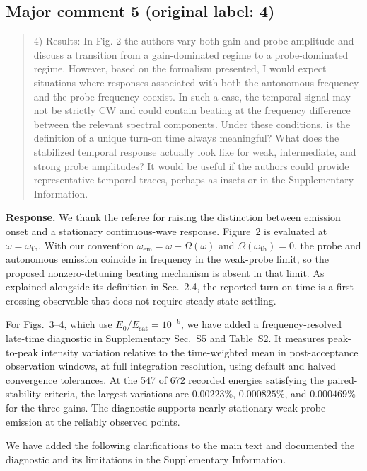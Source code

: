 \documentclass[11pt,a4paper]{article}
\newcommand{\reviewercomment}[1]{\begin{quote}\small #1\end{quote}}
\newcommand{\response}[1]{\par\textbf{Response.} #1\par}
\begin{document}
\subsection*{Major comment 5 (original label: 4)}
\label{r1-major-5}
\reviewercomment{
4) Results: In Fig. 2 the authors vary both gain and probe amplitude and discuss a transition from a gain-dominated regime to a probe-dominated regime. However, based on the formalism presented, I would expect situations where responses associated with both the autonomous frequency and the probe frequency coexist. In such a case, the temporal signal may not be strictly CW and could contain beating at the frequency difference between the relevant spectral components. Under these conditions, is the definition of a unique turn-on time always meaningful? What does the stabilized temporal response actually look like for weak, intermediate, and strong probe amplitudes? It would be useful if the authors could provide representative temporal traces, perhaps as insets or in the Supplementary Information.
}
\response{We thank the referee for raising the distinction between emission onset and a stationary continuous-wave response. Figure~2 is evaluated at $\omega=\omega_{\mathrm{th}}$. With our convention $\omega_{\mathrm{em}}=\omega-\Omega(\omega)$ and $\Omega(\omega_{\mathrm{th}})=0$, the probe and autonomous emission coincide in frequency in the weak-probe limit, so the proposed nonzero-detuning beating mechanism is absent in that limit. As explained alongside its definition in Sec.~2.4, the reported turn-on time is a first-crossing observable that does not require steady-state settling.

For Figs.~3--4, which use $E_0/E_{\mathrm{sat}}=10^{-9}$, we have added a frequency-resolved late-time diagnostic in Supplementary Sec.~S5 and Table~S2. It measures peak-to-peak intensity variation relative to the time-weighted mean in post-acceptance observation windows, at full integration resolution, using default and halved convergence tolerances. At the 547 of 672 recorded energies satisfying the paired-stability criteria, the largest variations are $0.00223\%$, $0.000825\%$, and $0.000469\%$ for the three gains. The diagnostic supports nearly stationary weak-probe emission at the reliably observed points.

We have added the following clarifications to the main text and documented the diagnostic and its limitations in the Supplementary Information.}
\end{document}
